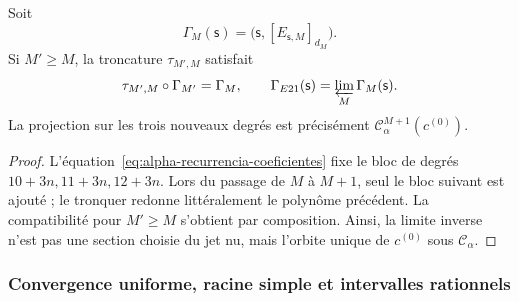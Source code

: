 \begin{proposition}
\label{prop:alpha-naturalidad-recurrencia-explicita}
Soit
\[
 \Gamma_M(\mathsf s)
 =\bigl(\mathsf s,[E_{\mathsf s,M}]_{d_M}\bigr).
\]
Si \(M'\geq M\), la troncature \(\tau_{M',M}\) satisfait
\begin{equation}
 \tau_{M',M}\circ\Gamma_{M'}=\Gamma_M,
 \qquad
 \Gamma_{E21}(\mathsf s)=\varprojlim_M\Gamma_M(\mathsf s).
 \label{eq:alpha-naturalidad-explicita}
\end{equation}
La projection sur les trois nouveaux degrés est précisément
\(\mathcal C_\alpha^{M+1}(c^{(0)})\).
\end{proposition}

\begin{proof}
L'équation~\eqref{eq:alpha-recurrencia-coeficientes} fixe le bloc de degrés \(10+3n,11+3n,12+3n\). Lors du passage de \(M\) à \(M+1\), seul le bloc suivant est ajouté ; le tronquer redonne littéralement le polynôme précédent. La compatibilité pour \(M'\geq M\) s'obtient par composition. Ainsi, la limite inverse n'est pas une section choisie du jet nu, mais l'orbite unique de \(c^{(0)}\) sous \(\mathcal C_\alpha\).
\end{proof}

\subsubsection{Convergence uniforme, racine simple et intervalles rationnels}
\label{subsec:alpha-cotas-completas-rev08}

